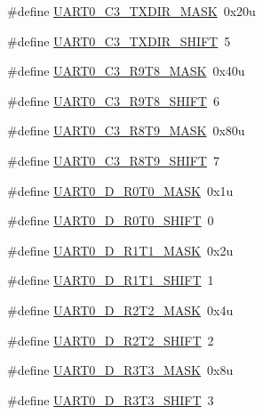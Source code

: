 \begin{DoxyCompactItemize}
\#define \hyperlink{group___u_a_r_t0___register___masks_gae1d9928e86dff5aff4ba866ce4c26476}{U\+A\+R\+T0\+\_\+\+C3\+\_\+\+T\+X\+D\+I\+R\+\_\+\+M\+A\+SK}~0x20u
\item 
\#define \hyperlink{group___u_a_r_t0___register___masks_ga8fd1bcbe36bf2b15e1f5bcd945271fd5}{U\+A\+R\+T0\+\_\+\+C3\+\_\+\+T\+X\+D\+I\+R\+\_\+\+S\+H\+I\+FT}~5
\item 
\#define \hyperlink{group___u_a_r_t0___register___masks_gafa2d2629bdfbedfd82f87d7abe60ef25}{U\+A\+R\+T0\+\_\+\+C3\+\_\+\+R9\+T8\+\_\+\+M\+A\+SK}~0x40u
\item 
\#define \hyperlink{group___u_a_r_t0___register___masks_gac12f14417be540ea9b0a593ff16ab0cc}{U\+A\+R\+T0\+\_\+\+C3\+\_\+\+R9\+T8\+\_\+\+S\+H\+I\+FT}~6
\item 
\#define \hyperlink{group___u_a_r_t0___register___masks_ga97ddd31ea21c76d2e25425f34a5ceeae}{U\+A\+R\+T0\+\_\+\+C3\+\_\+\+R8\+T9\+\_\+\+M\+A\+SK}~0x80u
\item 
\#define \hyperlink{group___u_a_r_t0___register___masks_ga18a7c7bb418d9b5cf9149d7feb365da3}{U\+A\+R\+T0\+\_\+\+C3\+\_\+\+R8\+T9\+\_\+\+S\+H\+I\+FT}~7
\item 
\#define \hyperlink{group___u_a_r_t0___register___masks_gafb52d25fd02d9e7f20c4e2c15b1b4582}{U\+A\+R\+T0\+\_\+\+D\+\_\+\+R0\+T0\+\_\+\+M\+A\+SK}~0x1u
\item 
\#define \hyperlink{group___u_a_r_t0___register___masks_gad74330f7b3c879005943f6bfb6641578}{U\+A\+R\+T0\+\_\+\+D\+\_\+\+R0\+T0\+\_\+\+S\+H\+I\+FT}~0
\item 
\#define \hyperlink{group___u_a_r_t0___register___masks_ga814724f492eb31ac3d56cf7b4c639cdf}{U\+A\+R\+T0\+\_\+\+D\+\_\+\+R1\+T1\+\_\+\+M\+A\+SK}~0x2u
\item 
\#define \hyperlink{group___u_a_r_t0___register___masks_ga1032022de13132a13b5e09a30839b493}{U\+A\+R\+T0\+\_\+\+D\+\_\+\+R1\+T1\+\_\+\+S\+H\+I\+FT}~1
\item 
\#define \hyperlink{group___u_a_r_t0___register___masks_gaa584f3ebf164a497e3008771d511fc7b}{U\+A\+R\+T0\+\_\+\+D\+\_\+\+R2\+T2\+\_\+\+M\+A\+SK}~0x4u
\item 
\#define \hyperlink{group___u_a_r_t0___register___masks_ga8fbb4283aa79977ed0f576dfd3960f64}{U\+A\+R\+T0\+\_\+\+D\+\_\+\+R2\+T2\+\_\+\+S\+H\+I\+FT}~2
\item 
\#define \hyperlink{group___u_a_r_t0___register___masks_gadfa2cd1862bf6eb53ee9ac5da895aafe}{U\+A\+R\+T0\+\_\+\+D\+\_\+\+R3\+T3\+\_\+\+M\+A\+SK}~0x8u
\item 
\#define \hyperlink{group___u_a_r_t0___register___masks_ga8b40852e3caf9131f78ca2a2238c5a5d}{U\+A\+R\+T0\+\_\+\+D\+\_\+\+R3\+T3\+\_\+\+S\+H\+I\+FT}~3

\end{DoxyCompactItemize}
